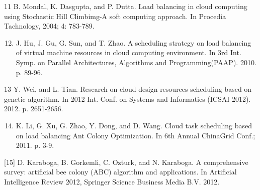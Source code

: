 \documentclass[10pt]{article}
\begin{document}
11 B. Mondal, K. Dasgupta, and P. Dutta. Load balancing in cloud computing using Stochastic Hill Climbimg-A soft computing approach. In Procedia Tachnology, 2004; 4: 783-789.

\begin{enumerate}
  \setcounter{enumi}{11}
  \item J. Hu, J. Gu, G. Sun, and T. Zhao. A scheduling strategy on load balancing of virtual machine resources in cloud computing environment. In 3rd Int. Symp. on Parallel Architectures, Algorithms and Programming(PAAP). 2010. p. 89-96.
\end{enumerate}

13 Y. Wei, and L. Tian. Research on cloud design resources scheduling based on genetic algorithm. In 2012 Int. Conf. on Systems and Informatics (ICSAI 2012). 2012. p. 2651-2656.

\begin{enumerate}
  \setcounter{enumi}{13}
  \item K. Li, G. Xu, G. Zhao, Y. Dong, and D. Wang. Cloud task scheduling based on load balancing Ant Colony Optimization. In 6th Annual ChinaGrid Conf.; 2011. p. 3-9.
\end{enumerate}

[15] D. Karaboga, B. Gorkemli, C. Ozturk, and N. Karaboga. A comprehensive survey: artificial bee colony (ABC) algorithm and applications. In Artificial Intelligence Review 2012, Springer Science Business Media B.V. 2012.
\end{document}

